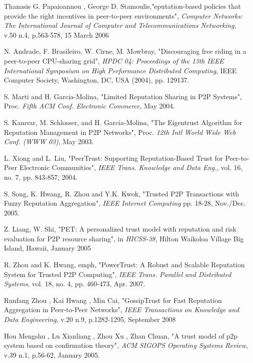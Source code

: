\documentclass{IEEEtran}
\begin{document}
\begin{thebibliography}{1}
Thanasis G. Papaioannou , George D. Stamoulis,"eputation-based policies
that provide the right incentives in peer-to-peer environments", \emph{Computer
Networks: The International Journal of Computer and Telecommunications
Networking}, v.50 n.4, p.563-578, 15 March 2006

N. Andrade, F. Brasileiro, W. Cirne, M. Mowbray, "Discouraging free riding in a
peer-to-peer CPU-sharing grid", \emph{HPDC 04: Proceedings of the 13th IEEE
International Symposium on High Performance Distributed Computing},
IEEE Computer Society, Washington, DC, USA (2004), pp. 129137.

S. Marti and H. Garcia-Molina, "Limited Reputation Sharing in P2P
Systems", Proc. \emph{Fifth ACM Conf. Electronic Commerce}, May 2004.

S. Kamvar, M. Schlosser, and H. Garcia-Molina, "The Eigentrust Algorithm
for Reputation Management in P2P Networks", Proc. \emph{12th Intl World Wide Web Conf. (WWW 03)}, May 2003.

L. Xiong and L. Liu, "PeerTrust: Supporting Reputation-Based Trust for
Peer-to-Peer Electronic Communities", \emph{IEEE Trans. Knowledge and Data Eng.}, vol. 16, no. 7, pp. 843-857, 2004.

S. Song, K. Hwang, R. Zhou and Y.K. Kwok, "Trusted P2P Transactions with
Fuzzy Reputation Aggregation", \emph{IEEE Internet Computing} pp. 18-28, Nov./Dec.
2005.

Z. Liang, W. Shi, "PET: A personalized trust model with reputation and risk
evaluation for P2P resource sharing", in \emph{HICSS-38}, Hilton Waikoloa Village Big Island, Hawaii, January 2005

R. Zhou and K. Hwang, emph, "PowerTrust: A Robust and Scalable Reputation System
for Trusted P2P Computing", \emph{IEEE Trans. Parallel and Distributed Systems}, vol. 18, no. 4, pp. 460-473, Apr. 2007.

Runfang Zhou , Kai Hwang , Min Cai, "GossipTrust for Fast Reputation
Aggregation in Peer-to-Peer Networks", \emph{IEEE Transactions on Knowledge and Data Engineering}, v.20 n.9, p.1282-1295, September 2008

Hou Mengshu , Lu Xianliang , Zhou Xu , Zhan Chuan, "A trust model of p2p
system based on confirmation theory", \emph{ACM SIGOPS Operating Systems Review}, v.39 n.1, p.56-62, January 2005.


\end{thebibliography}
\end{document}
